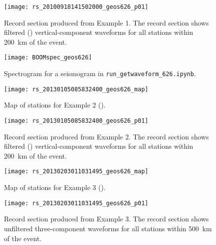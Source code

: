 \documentclass[11pt,titlepage,fleqn]{article}
\newcommand{\tfile}{{\tt run\_getwaveform\_626.ipynb}}
\begin{document}
\clearpage\pagebreak
\begin{figure}
\hspace{-1.25cm}
\texttt{[image: rs\_20100918141502000\_geos626\_p01]}
\caption[]
{{
Record section produced from Example 1.
The record section shows filtered () vertical-component waveforms for all stations within 200~km of the event.
}}
\label{fig:rs_ex01}
\end{figure}

\clearpage\pagebreak
\begin{figure}
\centering
\texttt{[image: BOOMspec\_geos626]}
\caption[]
{{
Spectrogram for a seismogram in \tfile.
}}
\label{fig:BOOM}
\end{figure}


\clearpage\pagebreak
\begin{figure}
\centering
\texttt{[image: rs\_20130105085832400\_geos626\_map]}
\caption[]
{{
Map of stations for Example 2 ().
}}
\label{fig:map_ex02}
\end{figure}

\clearpage\pagebreak
\begin{figure}
\hspace{-1.25cm}
\texttt{[image: rs\_20130105085832400\_geos626\_p01]}
\caption[]
{{
Record section produced from Example 2.
The record section shows filtered () vertical-component waveforms for all stations within 200~km of the event.
}}
\label{fig:rs_ex02}
\end{figure}


\clearpage\pagebreak
\begin{figure}
\centering
\texttt{[image: rs\_20130203011031495\_geos626\_map]}
\caption[]
{{
Map of stations for Example 3 ().
}}
\label{fig:map_ex03}
\end{figure}

\clearpage\pagebreak
\begin{figure}
\hspace{-1.25cm}
\texttt{[image: rs\_20130203011031495\_geos626\_p01]}
\caption[]
{{
Record section produced from Example 3.
The record section shows unfiltered three-component waveforms for all stations within 500~km of the event.
}}
\label{fig:rs_ex03}
\end{figure}

\end{document}
